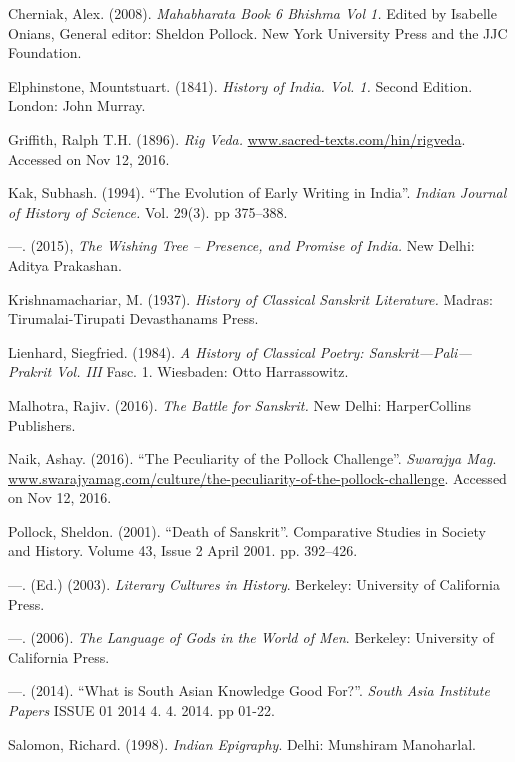 \begin{thebibliography}{99}
 Cherniak, Alex. (2008). \textit{Mahabharata Book 6 Bhishma Vol 1.} Edited by Isabelle Onians, General editor: Sheldon Pollock. New York University Press and the JJC Foundation.

  Elphinstone, Mountstuart. (1841). \textit{History of India. Vol. 1.} Second Edition. London: John Murray.

  Griffith, Ralph T.H. (1896). \textit{Rig Veda.} \url{www.sacred-texts.com/hin/rigveda}. Accessed on Nov 12, 2016.

  Kak, Subhash. (1994). “The Evolution of Early Writing in India”. \textit{Indian Journal of History of Science.} Vol. 29(3). pp 375–388.

  —. (2015), \textit{The Wishing Tree – Presence, and Promise of India.} New Delhi: Aditya Prakashan.

  Krishnamachariar, M. (1937). \textit{History of Classical Sanskrit Literature.} Madras: Tirumalai-Tirupati Devasthanams Press.

  Lienhard, Siegfried. (1984). \textit{A History of Classical Poetry: Sanskrit—Pali—Prakrit Vol. III} Fasc. 1. Wiesbaden: Otto Harrassowitz.

  Malhotra, Rajiv. (2016). \textit{The Battle for Sanskrit.} New Delhi: HarperCollins Publishers.

  Naik, Ashay. (2016). “The Peculiarity of the Pollock Challenge”. \textit{Swarajya Mag}. \url{www.swarajyamag.com/culture/the-peculiarity-of-the-pollock-challenge}. Accessed on Nov 12, 2016.

  Pollock, Sheldon. (2001). “Death of Sanskrit”. Comparative Studies in Society and History. Volume 43, Issue 2 April 2001. pp. 392–426. 

  —. (Ed.) (2003). \textit{Literary Cultures in History}. Berkeley: University of California Press.

  —. (2006). \textit{The Language of Gods in the World of Men}. Berkeley: University of California Press.

  —. (2014). “What is South Asian Knowledge Good For?”. \textit{South Asia Institute Papers} ISSUE 01 2014 4. 4. 2014. pp 01-22.

  Salomon, Richard. (1998). \textit{Indian Epigraphy}. Delhi: Munshiram Manoharlal.


\end{thebibliography}
